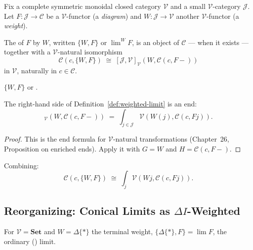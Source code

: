 Fix a complete symmetric monoidal closed category $\mathcal{V}$ and a small
$\mathcal{V}$-category $\mathcal{J}$. Let $F : \mathcal{J} \to \mathcal{C}$
be a $\mathcal{V}$-functor (a \emph{diagram}) and $W : \mathcal{J} \to
\mathcal{V}$ another $\mathcal{V}$-functor (a \emph{weight}).

\begin{definition}
\label{def:weighted-limit}
The  of $F$ by $W$, written $\{W, F\}$ or $\lim^W F$,
is an object of $\mathcal{C}$ — when it exists — together with a $\mathcal{V}$-natural
isomorphism
\begin{equation*}
  \mathcal{C}(c, \{W, F\}) \;\cong\; [\mathcal{J}, \mathcal{V}]_\mathcal{V}(W,
  \mathcal{C}(c, F-))
\end{equation*}
in $\mathcal{V}$, naturally in $c \in \mathcal{C}$.
\end{definition}

\begin{howtosay}
$\{W, F\}$  or .
\end{howtosay}

\begin{theorem}
\label{thm:wlim-end-formula}
The right-hand side of Definition~\ref{def:weighted-limit} is an end:
\begin{equation*}
  [\mathcal{J}, \mathcal{V}]_\mathcal{V}(W, \mathcal{C}(c, F-))
  \;=\;
  \int_{j \in \mathcal{J}} \mathcal{V}(W(j), \mathcal{C}(c, F j)).
\end{equation*}
\end{theorem}

\begin{proof}
This is the end formula for $\mathcal{V}$-natural transformations
(Chapter~26, Proposition on enriched ends). Apply it with $G = W$ and $H =
\mathcal{C}(c, F-)$.
\end{proof}

Combining:
\begin{equation*}
  \mathcal{C}(c, \{W, F\})
  \;\cong\;
  \int_j \mathcal{V}(W j, \mathcal{C}(c, F j)).
\end{equation*}

\subsection{Reorganizing: Conical Limits as $\Delta I$-Weighted}

\begin{proposition}
\label{prop:conical-as-weighted}
For $\mathcal{V} = \mathbf{Set}$ and $W = \Delta\{*\}$ the terminal weight,
$\{\Delta\{*\}, F\} = \lim F$, the ordinary () limit.
\end{proposition}

